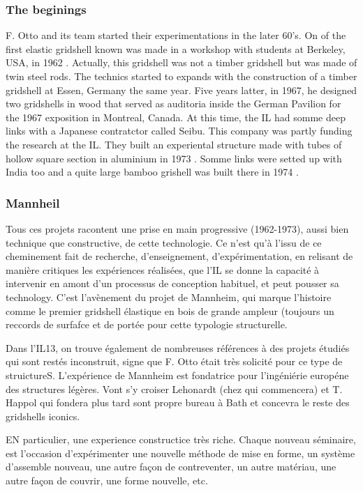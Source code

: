 \clearpage

\subsubsection{The beginings}

F. Otto and its team started their experimentations in the later 60's. On of the first elastic gridshell known was made in a workshop with students at Berkeley, USA, in 1962 \cite[p.~270]{IL10}. Actually, this gridshell was not a timber gridshell but was made of twin steel rods. The technics started to expands with the construction of a timber gridshell at Essen, Germany the same year. Five years latter, in 1967, he designed two gridshells in wood that served as auditoria inside the German Pavilion for the 1967 exposition in Montreal, Canada. At this time, the IL had somme deep links with a Japanese contratctor called Seibu. This company was partly funding the research at the IL. They built an experiental structure made with tubes of hollow square section in aluminium in 1973 \cite[p.~245]{IL13}. Somme links were setted up with India too and a quite large bamboo grishell was built there in 1974 \cite[p.~304]{IL10}.

\subsubsection{Mannheil}
Tous ces projets racontent une prise en main progressive (1962-1973), aussi bien technique que constructive, de cette technologie. Ce n'est qu'à l'issu de ce cheminement fait de recherche, d'enseignement, d'expérimentation, en relisant de manière critiques les expériences réalisées, que l'IL se donne la capacité à intervenir en amont d'un processus de conception habituel, et peut pousser sa technology. C'est l'avènement du projet de Mannheim, qui marque l'histoire comme le premier gridshell élastique en bois de grande ampleur (toujours un reccords de surfafce et de portée pour cette typologie structurelle.

Dans l'IL13, on trouve également de nombreuses références à des projets étudiés qui sont restés inconstruit,  signe que F. Otto était très solicité pour ce type de struictureS.
L'expérience de Mannheim est fondatrice pour l'ingéniérie européne des structures légères. Vont s'y croiser Lehonardt (chez qui commencera) et T. Happol qui fondera plus tard sont propre bureau à Bath et concevra le reste des gridshells iconics.

EN particulier, une experience constructice très riche. Chaque nouveau séminaire, est l'occasion d'expérimenter une nouvelle méthode de mise en forme, un système d'assemble nouveau, une autre façon de contreventer, un autre matériau, une autre façon de couvrir, une forme nouvelle, etc.


